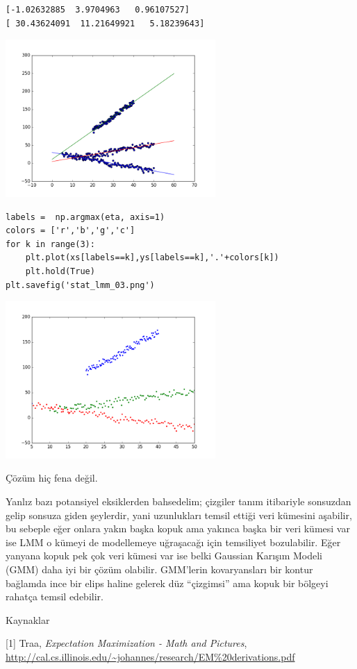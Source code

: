 \documentclass[12pt,fleqn]{article}\usepackage{../../common}
\begin{document}
\begin{verbatim}
[-1.02632885  3.9704963   0.96107527]
[ 30.43624091  11.21649921   5.18239643]
\end{verbatim}

\includegraphics[height=6cm]{stat_lmm_02.png}

\begin{verbatim}
labels =  np.argmax(eta, axis=1)
colors = ['r','b','g','c']
for k in range(3):    
    plt.plot(xs[labels==k],ys[labels==k],'.'+colors[k])
    plt.hold(True)    
plt.savefig('stat_lmm_03.png')
\end{verbatim}

\includegraphics[height=6cm]{stat_lmm_03.png}

Çözüm hiç fena değil. 

Yanlız bazı potansiyel eksiklerden bahsedelim; çizgiler tanım itibariyle
sonsuzdan gelip sonsuza giden şeylerdir, yani uzunlukları temsil ettiği
veri kümesini aşabilir, bu sebeple eğer onlara yakın başka kopuk ama
yakınca başka bir veri kümesi var ise LMM o kümeyi de modellemeye
uğraşacağı için temsiliyet bozulabilir. Eğer yanyana kopuk pek çok veri
kümesi var ise belki Gaussian Karışım Modeli (GMM) daha iyi bir çözüm
olabilir. GMM'lerin kovaryansları bir kontur bağlamda ince bir elips haline
gelerek düz ``çizgimsi'' ama kopuk bir bölgeyi rahatça temsil edebilir.

Kaynaklar

[1] Traa, {\em Expectation Maximization - Math and Pictures},
\url{http://cal.cs.illinois.edu/~johannes/research/EM%20derivations.pdf}
\end{document}
